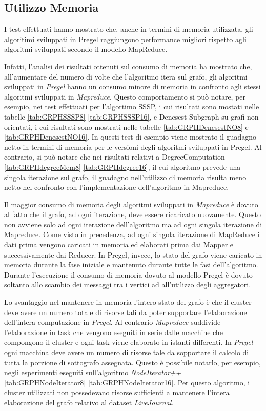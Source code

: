 \documentclass[LaM,binding=0.6cm]{sapthesis}
\begin{document}
\clearpage


\subsection{Utilizzo Memoria}

I test effettuati hanno mostrato che, anche in termini di memoria utilizzata, gli algoritimi sviluppati in Pregel raggiungono performance migliori rispetto agli algoritmi sviluppati secondo il modello MapReduce.

Infatti, l'analisi dei risultati ottenuti sul consumo di memoria ha mostrato che, all'aumentare del numero di volte che l'algoritmo itera sul grafo, gli algoritmi sviluppati in \textit{Pregel} hanno un consumo minore di memoria in confronto agli stessi algoritmi sviluppati in \textit{Mapreduce}. Questo comportamento si può notare, per esempio, nei test effettuati per l'algortimo SSSP, i cui risultati sono mostati nelle tabelle \ref{tab:GRPHSSSP8} \ref{tab:GRPHSSSP16}, e Denesest Subgraph su grafi non orientati, i cui risultati sono mostrati nelle tabelle \ref{tab:GRPHDenesestNO8} e \ref{tab:GRPHDenesestNO16}. In questi test di esempio viene mostrato il guadagno netto in termini di memoria per le versioni degli algoritmi sviluppati in Pregel. Al contrario, si può notare che nei risultati relativi a DegreeComputation \ref{tab:GRPHdegreeMem8} \ref{tab:GRPHdegree16}, il cui algoritmo prevede una singola iterazione sul grafo, il guadagno nell'utilizzo di memoria risulta meno netto nel confronto con l'implementazione dell'algoritmo in Mapreduce.

Il maggior consumo di memoria degli algoritmi sviluppati in \textit{Mapreduce} è dovuto al fatto che il grafo, ad ogni iterazione, deve essere ricaricato nuovamente. Questo non avviene solo ad ogni iterazione dell'algoritmo ma ad ogni singola iterazione di Mapreduce. Come visto in precedenza, ad ogni singola iterazione di MapReduce i dati prima vengono caricati in memoria ed elaborati prima dai Mapper e successivamente dai Reducer.
In Pregel, invece, lo stato del grafo viene caricato in memoria durante la fase iniziale e mantenuto durante tutte le fasi dell'algoritmo. Durante l'esecuzione il consumo di memoria dovuto al modello Pregel è dovuto soltanto allo scambio dei messaggi tra i vertici ad all'utilizzo degli aggregatori.

Lo svantaggio nel mantenere in memoria l'intero stato del grafo è che il cluster deve avere un numero totale di risorse tali da poter supportare l'elaborazione dell'intera computazione in \textit{Pregel}. Al contrario \textit{Mapreduce} suddivide l'elaborazione in task che vengono eseguiti in serie dalle macchine che compongono il cluster e ogni task viene  elaborato in istanti differenti. In \textit{Pregel} ogni macchina deve avere un numero di risorse tale da sopportare il calcolo di tutta la porzione di sottografo assegnata.
Questo è possibile notarlo, per esempio, negli esperimenti eseguiti sull'algoritmo \textit{NodeIterator++} \ref{tab:GRPHNodeIterator8} \ref{tab:GRPHNodeIterator16}. Per questo algoritmo, i cluster utilizzati non possedevano risorse sufficienti a mantenere l'intera elaborazione del grafo relativo al dataset \textit{LiveJournal}.
\end{document}
